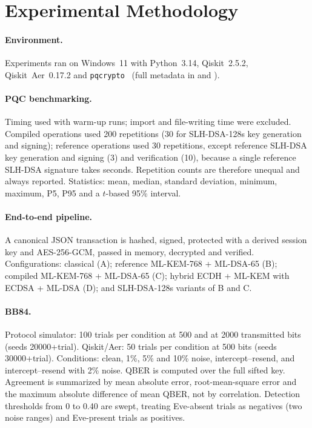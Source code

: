 \section{Experimental Methodology}\label{sec:method}
\paragraph{Environment.} Experiments ran on Windows~11 with Python~3.14, Qiskit~2.5.2, Qiskit~Aer~0.17.2 and \texttt{pqcrypto}~\PqcryptoVersion{} (full metadata in  and ).

\paragraph{PQC benchmarking.} Timing used  with warm-up runs; import and file-writing time were excluded. Compiled operations used 200 repetitions (30 for SLH-DSA-128s key generation and signing); reference operations used 30 repetitions, except reference SLH-DSA key generation and signing (3) and verification (10), because a single reference SLH-DSA signature takes seconds. Repetition counts are therefore unequal and always reported. Statistics: mean, median, standard deviation, minimum, maximum, P5, P95 and a $t$-based 95\% interval.

\paragraph{End-to-end pipeline.} A canonical JSON transaction is hashed, signed, protected with a derived session key and AES-256-GCM, passed in memory, decrypted and verified. Configurations: classical (A); reference ML-KEM-768 + ML-DSA-65 (B); compiled ML-KEM-768 + ML-DSA-65 (C); hybrid ECDH + ML-KEM with ECDSA + ML-DSA (D); and SLH-DSA-128s variants of B and C.

\paragraph{BB84.} Protocol simulator: 100 trials per condition at 500 and at 2000 transmitted bits (seeds 20000+trial). Qiskit/Aer: 50 trials per condition at 500 bits (seeds 30000+trial). Conditions: clean, 1\%, 5\% and 10\% noise, intercept--resend, and intercept--resend with 2\% noise. QBER is computed over the full sifted key. Agreement is summarized by mean absolute error, root-mean-square error and the maximum absolute difference of mean QBER, not by correlation. Detection thresholds from 0 to 0.40 are swept, treating Eve-absent trials as negatives (two noise ranges) and Eve-present trials as positives.

